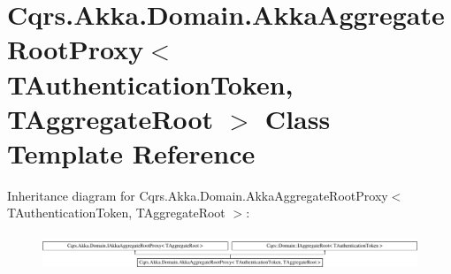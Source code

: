 \hypertarget{classCqrs_1_1Akka_1_1Domain_1_1AkkaAggregateRootProxy}{}\section{Cqrs.\+Akka.\+Domain.\+Akka\+Aggregate\+Root\+Proxy$<$ T\+Authentication\+Token, T\+Aggregate\+Root $>$ Class Template Reference}
\label{classCqrs_1_1Akka_1_1Domain_1_1AkkaAggregateRootProxy}
Inheritance diagram for Cqrs.\+Akka.\+Domain.\+Akka\+Aggregate\+Root\+Proxy$<$ T\+Authentication\+Token, T\+Aggregate\+Root $>$\+:\begin{figure}[H]
\begin{center}
\leavevmode
\includegraphics[height=1.081081cm]{classCqrs_1_1Akka_1_1Domain_1_1AkkaAggregateRootProxy}
\end{center}
\end{figure}
